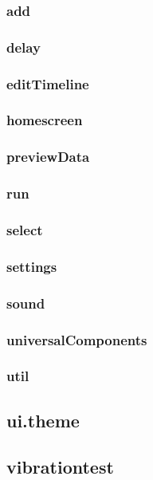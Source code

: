 \subsubsection{add}
\subsubsection{delay}
\subsubsection{editTimeline}
\subsubsection{homescreen}
\subsubsection{previewData}
\subsubsection{run}
\subsubsection{select}
\subsubsection{settings}
\subsubsection{sound}
\subsubsection{universalComponents}
\subsubsection{util}

\subsection{ui.theme}

\subsection{vibrationtest}


\section{ }